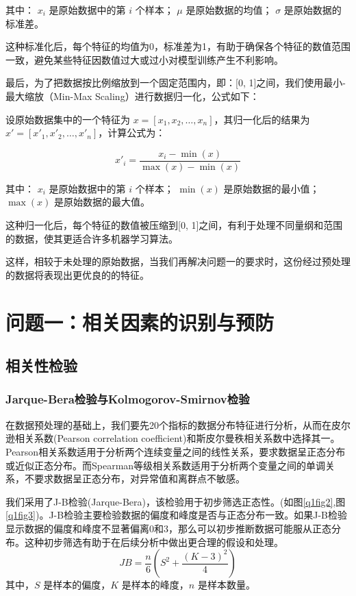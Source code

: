 \documentclass[withoutpreface,bwprint]{cumcmthesis} %
\begin{document}
其中：
\( x_i \) 是原始数据中的第 \( i \) 个样本；
\( \mu \) 是原始数据的均值；
\( \sigma \) 是原始数据的标准差。

这种标准化后，每个特征的均值为0，标准差为1，有助于确保各个特征的数值范围一致，避免某些特征因数值过大或过小对模型训练产生不利影响。

最后，为了把数据按比例缩放到一个固定范围内，即：[0, 1]之间，我们使用最小-最大缩放（Min-Max Scaling）进行数据归一化，公式如下：

设原始数据集中的一个特征为 \( x = [x_1, x_2, \ldots, x_n] \)，其归一化后的结果为 \( x' = [x'_1, x'_2, \ldots, x'_n] \)，计算公式为：

\begin{equation}
x'_i = \frac{x_i - \min(x)}{\max(x) - \min(x)}
\end{equation}

其中：
\( x_i \) 是原始数据中的第 \( i \) 个样本；
\( \min(x) \) 是原始数据的最小值；
\( \max(x) \) 是原始数据的最大值。

这种归一化后，每个特征的数值被压缩到[0, 1]之间，有利于处理不同量纲和范围的数据，使其更适合许多机器学习算法。

这样，相较于未处理的原始数据，当我们再解决问题一的要求时，这份经过预处理的数据将表现出更优良的的特征。
\section{问题一：相关因素的识别与预防}
\subsection{相关性检验}
\subsubsection{Jarque-Bera检验与Kolmogorov-Smirnov检验}
在数据预处理的基础上，我们要先20个指标的数据分布特征进行分析，从而在皮尔逊相关系数(Pearson correlation coefficient)和斯皮尔曼秩相关系数中选择其一。Pearson相关系数适用于分析两个连续变量之间的线性关系，要求数据呈正态分布或近似正态分布。而Spearman等级相关系数适用于分析两个变量之间的单调关系，不要求数据呈正态分布，对异常值和离群点不敏感。

我们采用了J-B检验(Jarque-Bera)，该检验用于初步筛选正态性。(如图\ref{q1fig2},图\ref{q1fig3})。J-B检验主要检验数据的偏度和峰度是否与正态分布一致。如果J-B检验显示数据的偏度和峰度不显著偏离0和3，那么可以初步推断数据可能服从正态分布。这种初步筛选有助于在后续分析中做出更合理的假设和处理。
\begin{equation}\label{eq3}
JB = \frac{n}{6} \left( S^2 + \frac{(K-3)^2}{4} \right)
\end{equation}
其中，\(S\) 是样本的偏度，\(K\) 是样本的峰度，\(n \) 是样本数量。
\end{document}
